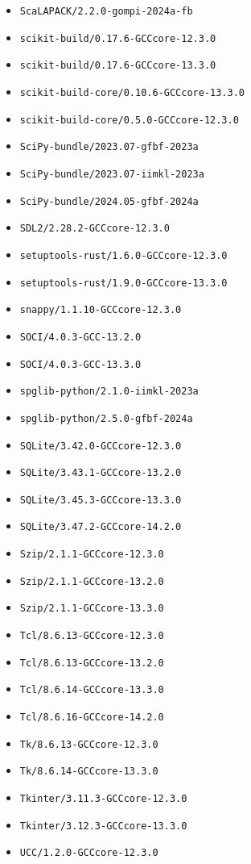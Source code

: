 \begin{multicols}{3}
\begin{itemize}
\item \verb|ScaLAPACK/2.2.0-gompi-2024a-fb|
\item \verb|scikit-build/0.17.6-GCCcore-12.3.0|
\item \verb|scikit-build/0.17.6-GCCcore-13.3.0|
\item \verb|scikit-build-core/0.10.6-GCCcore-13.3.0|
\item \verb|scikit-build-core/0.5.0-GCCcore-12.3.0|
\item \verb|SciPy-bundle/2023.07-gfbf-2023a|
\item \verb|SciPy-bundle/2023.07-iimkl-2023a|
\item \verb|SciPy-bundle/2024.05-gfbf-2024a|
\item \verb|SDL2/2.28.2-GCCcore-12.3.0|
\item \verb|setuptools-rust/1.6.0-GCCcore-12.3.0|
\item \verb|setuptools-rust/1.9.0-GCCcore-13.3.0|
\item \verb|snappy/1.1.10-GCCcore-12.3.0|
\item \verb|SOCI/4.0.3-GCC-13.2.0|
\item \verb|SOCI/4.0.3-GCC-13.3.0|
\item \verb|spglib-python/2.1.0-iimkl-2023a|
\item \verb|spglib-python/2.5.0-gfbf-2024a|
\item \verb|SQLite/3.42.0-GCCcore-12.3.0|
\item \verb|SQLite/3.43.1-GCCcore-13.2.0|
\item \verb|SQLite/3.45.3-GCCcore-13.3.0|
\item \verb|SQLite/3.47.2-GCCcore-14.2.0|
\item \verb|Szip/2.1.1-GCCcore-12.3.0|
\item \verb|Szip/2.1.1-GCCcore-13.2.0|
\item \verb|Szip/2.1.1-GCCcore-13.3.0|
\item \verb|Tcl/8.6.13-GCCcore-12.3.0|
\item \verb|Tcl/8.6.13-GCCcore-13.2.0|
\item \verb|Tcl/8.6.14-GCCcore-13.3.0|
\item \verb|Tcl/8.6.16-GCCcore-14.2.0|
\item \verb|Tk/8.6.13-GCCcore-12.3.0|
\item \verb|Tk/8.6.14-GCCcore-13.3.0|
\item \verb|Tkinter/3.11.3-GCCcore-12.3.0|
\item \verb|Tkinter/3.12.3-GCCcore-13.3.0|
\item \verb|UCC/1.2.0-GCCcore-12.3.0|

\end{itemize}
\end{multicols}

